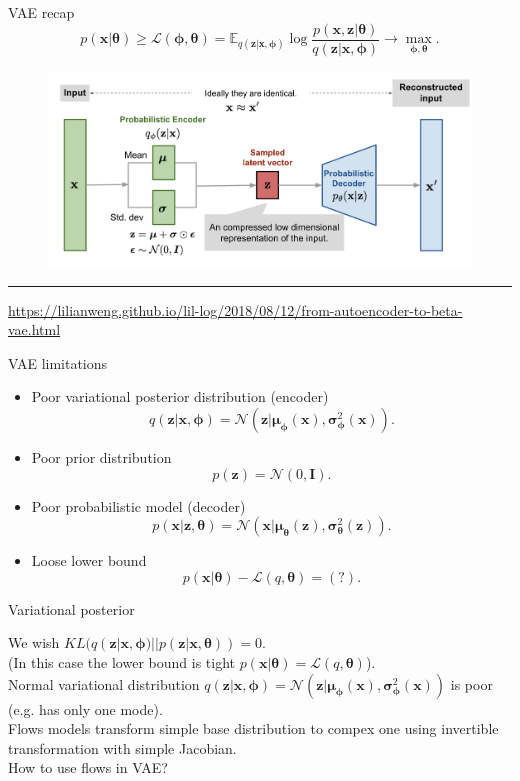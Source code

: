 \documentclass{beamer}
\newcommand{\bx}{\mathbf{x}}
\newcommand{\bz}{\mathbf{z}}
\newcommand{\bmu}{\boldsymbol{\mu}}
\newcommand{\bsigma}{\boldsymbol{\sigma}}
\newcommand{\btheta}{\boldsymbol{\theta}}
\newcommand{\bphi}{\boldsymbol{\phi}}
\begin{document}
\begin{frame}{VAE recap}
	\vspace{-0.5cm}
	\[
	p(\bx | \btheta) \geq \mathcal{L} (\bphi, \btheta)  = \mathbb{E}_{q(\bz | \bx, \bphi)} \log \frac{p(\bx, \bz | \btheta)}{q(\bz| \bx, \bphi)} \rightarrow \max_{\bphi, \btheta}.
	\]
	\vspace{-0.5cm}
	\begin{figure}[h]
		\centering
		\includegraphics[width=\linewidth]{figs/vae-gaussian.png}
	\end{figure}
	\hrule\medskip
	{\scriptsize \href{https://lilianweng.github.io/lil-log/2018/08/12/from-autoencoder-to-beta-vae.html}{https://lilianweng.github.io/lil-log/2018/08/12/from-autoencoder-to-beta-vae.html}}
	
\end{frame}
\begin{frame}{VAE limitations}
	\begin{itemize}
		\item Poor variational posterior distribution (encoder)
		\[
		q(\bz | \bx, \bphi) = \mathcal{N}(\bz| \bmu_{\bphi}(\bx), \bsigma^2_{\bphi}(\bx)).
		\]
		\item Poor prior distribution
		\[
		p(\bz) = \mathcal{N}(0, \mathbf{I}).
		\]
		\item Poor probabilistic model (decoder)
		\[
		p(\bx | \bz, \btheta) = \mathcal{N}(\bx| \bmu_{\btheta}(\bz), \bsigma^2_{\btheta}(\bz)).
		\]
		\item Loose lower bound
		\[
		p(\bx | \btheta) - \mathcal{L}(q, \btheta) = (?).
		\]
	\end{itemize}
\end{frame}
\begin{frame}{Variational posterior}
	
	We wish $KL(q(\bz | \bx, \bphi) || p(\bz | \bx, \btheta)) = 0$. \\
	(In this case the lower bound is tight $p(\bx | \btheta) = \mathcal{L}(q, \btheta)$). \\
	\vspace{0.5cm}
	Normal variational distribution $q(\bz | \bx, \bphi) = \mathcal{N}(\bz| \bmu_{\bphi}(\bx), \bsigma^2_{\bphi}(\bx))$ is poor (e.g. has only one mode). \\
	\vspace{0.5cm}
	Flows models transform simple base distribution to compex one using invertible transformation with simple Jacobian. \\
	\vspace{0.5cm}
	How to use flows in VAE?
\end{frame}
\end{document}
